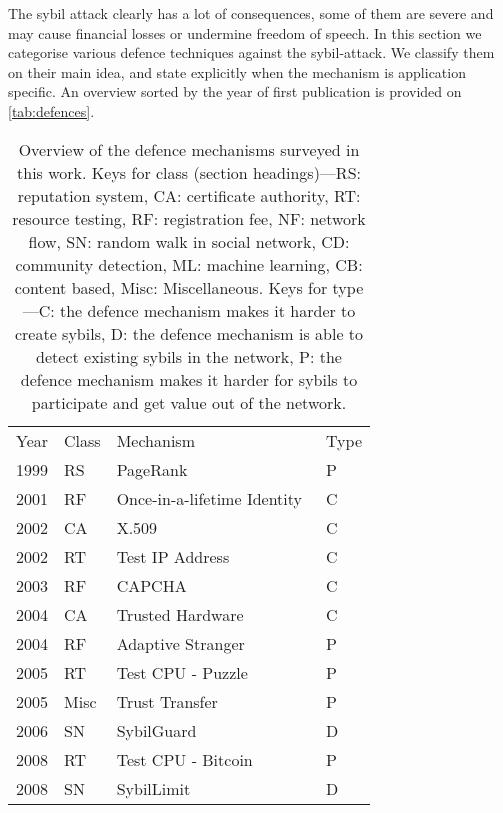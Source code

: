 The sybil attack clearly has a lot of consequences, some of them are severe and
may cause financial losses or undermine freedom of speech. In this section we
categorise various defence techniques against the sybil-attack. We classify them
on their main idea, and state explicitly when the mechanism is application
specific. An overview sorted by the year of first publication is provided on
\autoref{tab:defences}.

\begin{table}[]
\centering
\caption{Overview of the defence mechanisms surveyed in this work. Keys for
  class (section headings)---RS: reputation system, CA: certificate authority,
  RT: resource testing, RF: registration fee, NF: network flow, SN: random walk
  in social network, CD: community detection, ML: machine learning, CB: content
  based, Misc: Miscellaneous. Keys for type---C: the defence mechanism makes it
  harder to create sybils, D: the defence mechanism is able to detect existing
  sybils in the network, P: the defence mechanism makes it harder for sybils to
  participate and get value out of the network.}
\label{tab:defences}
\begin{tabular}{llll}
  Year & Class  & Mechanism & Type \\
  1999 & RS     & PageRank~\cite{page1999pagerank} & P  \\
  2001 & RF     & Once-in-a-lifetime Identity~\cite{resnick2001social} & C  \\
  2002 & CA     & X.509~\cite{housley2002internet} & C  \\
  2002 & RT     & Test IP Address~\cite{freedman2002tarzan} & C  \\
  2003 & RF     & CAPCHA~\cite{von2003captcha} & C  \\
  2004 & CA     & Trusted Hardware~\cite{newsome2004sybil} & C  \\
  2004 & RF     & Adaptive Stranger~\cite{feldman2004robust} & P  \\
  2005 & RT     & Test CPU - Puzzle~\cite{aspnes2005exposing} & P \\
  2005 & Misc   & Trust Transfer~\cite{seigneur2005trust} & P  \\
  2006 & SN     & SybilGuard~\cite{yu2006sybilguard} & D  \\
  2008 & RT     & Test CPU - Bitcoin~\cite{nakamoto2008bitcoin} & P \\
  2008 & SN     & SybilLimit~\cite{yu2008sybillimit} & D  \\

\end{tabular}
\end{table}
